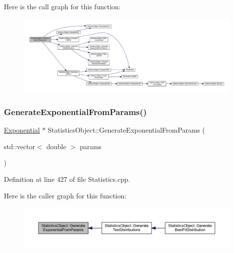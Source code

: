 Here is the call graph for this function\+:
\nopagebreak
\begin{figure}[H]
\begin{center}
\leavevmode
\includegraphics[width=350pt]{class_statistics_object_a88d8c8b8fd57da4a08cf1d02d363abf1_cgraph}
\end{center}
\end{figure}
\mbox{\label{class_statistics_object_a850dc5ba25d9017f5a586ba2ffd64d94}} 
\subsubsection{\texorpdfstring{Generate\+Exponential\+From\+Params()}{GenerateExponentialFromParams()}}
{\footnotesize\ttfamily \hyperlink{class_exponential}{Exponential} $\ast$ Statistics\+Object\+::\+Generate\+Exponential\+From\+Params (\begin{DoxyParamCaption}\item[{std\+::vector$<$ double $>$}]{params }\end{DoxyParamCaption})}



Definition at line 427 of file Statistics.\+cpp.

Here is the caller graph for this function\+:
\nopagebreak
\begin{figure}[H]
\begin{center}
\leavevmode
\includegraphics[width=350pt]{class_statistics_object_a850dc5ba25d9017f5a586ba2ffd64d94_icgraph}
\end{center}
\end{figure}
\mbox{\label{class_statistics_object_a59cffa517dbb293e1f8fe72f2e6dd34f}} 
